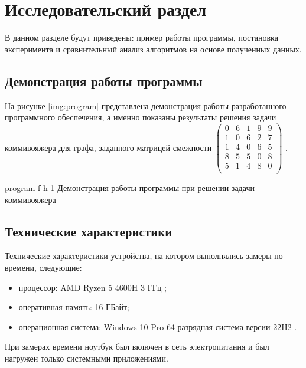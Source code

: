 \chapter{Исследовательский раздел}

В данном разделе будут приведены: пример работы программы, постановка эксперимента и сравнительный анализ алгоритмов на основе полученных данных.

\section{Демонстрация работы программы}


На рисунке \ref{img:program} представлена демонстрация работы разработанного программного обеспечения, а именно показаны результаты решения задачи коммивояжера для графа, заданного матрицей смежности $\begin{pmatrix}
	0 & 6 & 1 & 9 & 9 \\
	1 & 0 & 6 & 2 & 7 \\
	1 & 4 & 0 & 6 & 5 \\
	8 & 5 & 5 & 0 & 8 \\
	5 & 1 & 4 & 8 & 0 \\
\end{pmatrix}$ .  
\clearpage

{program} %
{f} %
{h} %
{1\textwidth} %
{Демонстрация работы программы при решении задачи коммивояжера} %

\clearpage


\section{Технические характеристики}

Технические характеристики устройства, на котором выполнялись замеры по времени, следующие:
\begin{itemize}
	\item процессор: AMD Ryzen 5 4600H 3 ГГц \cite{amd};
	\item оперативная память: 16 ГБайт;
	\item операционная система: Windows 10 Pro 64-разрядная система версии 22H2 \cite{windows}.
\end{itemize}

При замерах времени ноутбук был включен в сеть электропитания и был нагружен только системными приложениями.

